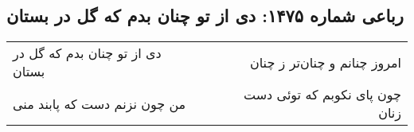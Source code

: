 \begin{center}
\section*{رباعی شماره ۱۴۷۵: دی از تو چنان بدم که گل در بستان}
\label{sec:1475}
\begin{longtable}{l p{0.5cm} r}
دی از تو چنان بدم که گل در بستان
&&
امروز چنانم و چنان‌تر ز چنان
\\
من چون نزنم دست که پابند منی
&&
چون پای نکوبم که توئی دست زنان
\\
\end{longtable}
\end{center}

